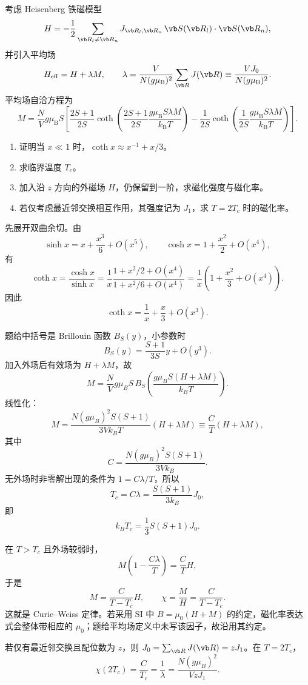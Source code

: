 \begin{question}
考虑 Heisenberg 铁磁模型
\[
 H=-\frac12\sum_{\vb R_l\ne\vb R_n}
 J_{\vb R_l,\vb R_n}\,\vb S(\vb R_l)\cdot\vb S(\vb R_n),
\]
并引入平均场
\[
 H_{\mathrm{eff}}=H+\lambda M,
 \qquad
 \lambda=\frac{V}{N(g\mu_{\mathrm B})^2}\sum_{\vb R}J(\vb R)
 \equiv\frac{VJ_0}{N(g\mu_{\mathrm B})^2}.
\]
平均场自洽方程为
\[
 M=\frac NV g\mu_{\mathrm B}S
 \left[
 \frac{2S+1}{2S}\coth\left(\frac{2S+1}{2S}\frac{g\mu_{\mathrm B}S\lambda M}{k_{\mathrm B}T}\right)
 -\frac1{2S}\coth\left(\frac1{2S}\frac{g\mu_{\mathrm B}S\lambda M}{k_{\mathrm B}T}\right)
 \right].
\]
\begin{enumerate}
  \item 证明当 $x\ll1$ 时，$\coth x\approx x^{-1}+x/3$。
  \item 求临界温度 $T_c$。
  \item 加入沿 $z$ 方向的外磁场 $H$，仍保留到一阶，求磁化强度与磁化率。
  \item 若仅考虑最近邻交换相互作用，其强度记为 $J_1$，求 $T=2T_c$ 时的磁化率。
\end{enumerate}


\begin{solution}
先展开双曲余切。由
\[
 \sinh x=x+\frac{x^3}{6}+O(x^5),\qquad
 \cosh x=1+\frac{x^2}{2}+O(x^4),
\]
有
\[
 \coth x=\frac{\cosh x}{\sinh x}
 =\frac1x\frac{1+x^2/2+O(x^4)}{1+x^2/6+O(x^4)}
 =\frac1x\left(1+\frac{x^2}{3}+O(x^4)\right).
\]
因此
\[
 \boxed{\coth x=\frac1x+\frac x3+O(x^3).}
\]

题给中括号是 Brillouin 函数 $B_S(y)$，小参数时
\[
 B_S(y)=\frac{S+1}{3S}y+O(y^3).
\]
加入外场后有效场为 $H+\lambda M$，故
\[
 M=\frac NVg\mu_BS\,B_S\left(
 \frac{g\mu_BS(H+\lambda M)}{k_BT}\right).
\]
线性化：
\[
 M=\frac{N(g\mu_B)^2S(S+1)}{3Vk_BT}(H+\lambda M)
 \equiv\frac CT(H+\lambda M),
\]
其中
\[
 C=\frac{N(g\mu_B)^2S(S+1)}{3Vk_B}.
\]
无外场时非零解出现的条件为 $1=C\lambda/T$，所以
\[
 T_c=C\lambda
 =\frac{S(S+1)}{3k_B}J_0,
\]
即
\[
 \boxed{k_BT_c=\frac13S(S+1)J_0.}
\]

在 $T>T_c$ 且外场较弱时，
\[
 M\left(1-\frac{C\lambda}{T}\right)=\frac CT H,
\]
于是
\[
 \boxed{M=\frac{C}{T-T_c}H,
 \qquad \chi=\frac MH=\frac{C}{T-T_c}.}
\]
这就是 Curie--Weiss 定律。若采用 SI 中 $B=\mu_0(H+M)$ 的约定，磁化率表达式会整体带相应的 $\mu_0$；题给平均场定义中未写该因子，故沿用其约定。

若仅有最近邻交换且配位数为 $z$，则
$J_0=\sum_{\vb R}J(\vb R)=zJ_1$。在 $T=2T_c$，
\[
 \chi(2T_c)=\frac{C}{T_c}=\frac1\lambda
 =\boxed{\frac{N(g\mu_B)^2}{VzJ_1}.}
\]
\end{solution}
\end{question}

